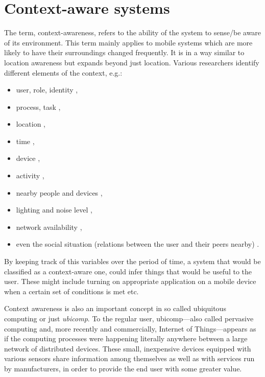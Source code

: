 \section{Context-aware systems}
\label{sec:context-aware}

The term, context-awareness, refers to the ability of the system to sense/be aware of its environment. This term mainly applies to mobile systems which are more likely to have their surroundings changed frequently. It is in a way similar to location awareness but expands beyond just location. Various researchers identify different elements of the context, e.g.:

\begin{itemize}
	\item user, role, identity \cite{Dey:context} \cite{Kaltz:context},
	\item process, task \cite{Kaltz:context},
	\item location \cite{Dey:context} \cite{Kaltz:context},
	\item time \cite{Dey:context} \cite{Kaltz:context},
	\item device \cite{Kaltz:context},
	\item activity \cite{Dey:context},
	\item nearby people and devices \cite{Rosslin:context},
	\item lighting and noise level \cite{Rosslin:context},
	\item network availability \cite{Rosslin:context},
	\item even the social situation (relations between the user and their peers nearby) \cite{Rosslin:context}.
\end{itemize}

By keeping track of this variables over the period of time, a system that would be classified as a context-aware one, could infer things that would be useful to the user. These might include turning on appropriate application on a mobile device when a certain set of conditions is met etc.

Context awareness is also an important concept in so called ubiquitous computing or just \emph{ubicomp}. To the regular user, ubicomp---also called pervasive computing and, more recently and commercially, Internet of Things---appears as if the computing processes were happening literally anywhere between a large network of distributed devices. These small, inexpensive devices equipped with various sensors share information among themselves as well as with services run by manufacturers, in order to provide the end user with some greater value.


